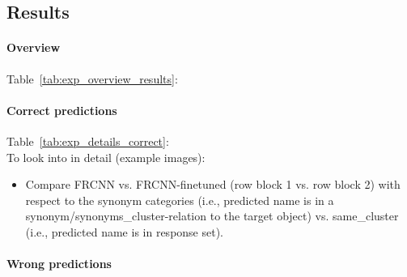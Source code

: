 \subsection{Results}
\paragraph{Overview}
Table\ \ref{tab:exp_overview_results}: 

\paragraph{Correct predictions}
Table\ \ref{tab:exp_details_correct}: \\
To look into in detail (example images): 
\begin{itemize}
	\item Compare FRCNN vs. FRCNN-finetuned (row block 1 vs. row block 2) with respect to the synonym categories (i.e., predicted name is in a synonym/synonyms\_cluster-relation to the target object) vs. same\_cluster (i.e., predicted name is in response set). 
\end{itemize}

\paragraph{Wrong predictions}

